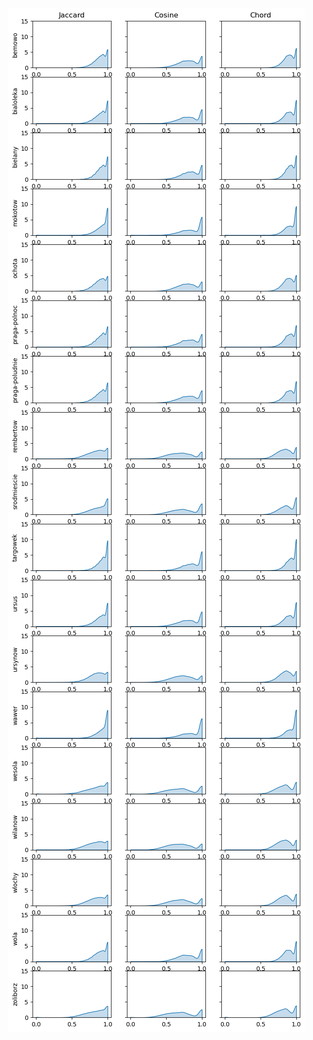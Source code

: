 \documentclass{article}
\begin{document}
\noindent
\includegraphics[height=\textheight]{dist_density.png}
\end{document}
